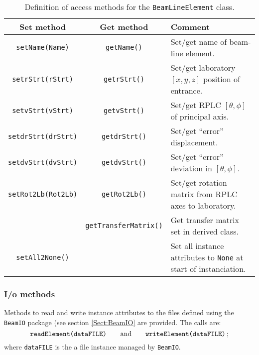 \begin{table}
  \caption{
    Definition of access methods for the \texttt{BeamLineElement}
    class. 
  }
  \label{Tab:BLE:Methods}
  \begin{center}
    \begin{tabular}{|c|c|p{7cm}|}
      \hline
      \textbf{Set method} & \textbf{Get method}  & \textbf{Comment}                                                         \\
      \hline
      \texttt{setName(Name)}     & \texttt{getName()}   & Set/get name of beam-line element.                                \\
      \texttt{setrStrt(rStrt)}   & \texttt{getrStrt()}  & Set/get laboratory $[x, y, z]$ position of entrance.              \\
      \texttt{setvStrt(vStrt)}   & \texttt{getvStrt()}  & Set/get RPLC $[\theta, \phi]$ of principal axis.                  \\
      \texttt{setdrStrt(drStrt)} & \texttt{getdrStrt()} & Set/get ``error'' displacement.                                   \\
      \texttt{setdvStrt(dvStrt)} & \texttt{getdvStrt()} & Set/get ``error'' deviation in $[\theta, \phi]$.                  \\
      \texttt{setRot2Lb(Rot2Lb)} & \texttt{getRot2Lb()} & Set/get rotation matrix from RPLC axes to laboratory.             \\
                         & \texttt{getTransferMatrix()} & Get transfer matrix set in derived class.                         \\
      \texttt{setAll2None()}     &                      & Set all instance attributes to \texttt{None} at start of instanciation. \\
      \hline
    \end{tabular}
  \end{center}
\end{table}

\subsubsection{I/o methods}
Methods to read and write instance attributes to the files defined
using the \texttt{BeamIO} package (see section \ref{Sect:BeamIO} are
provided.
The calls are:
\begin{equation}
  \texttt{readElement(dataFILE)} \quad \quad {\rm and }
      \quad \quad \texttt{writeElement(dataFILE)} \,; \nonumber
\end{equation}
where \texttt{dataFILE} is the a file instance managed by \texttt{BeamIO}.

